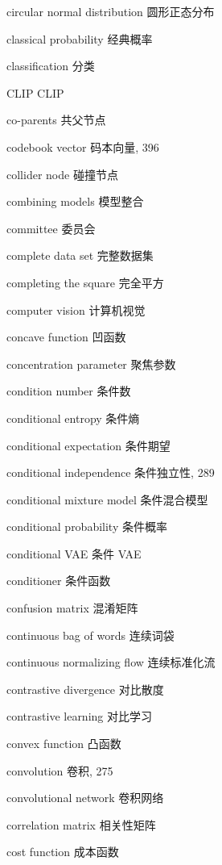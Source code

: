 circular normal distribution 圆形正态分布\par
classical probability 经典概率\par
classification 分类\par
CLIP CLIP\par
co-parents 共父节点\par
codebook vector 码本向量, 396\par
collider node 碰撞节点\par
combining models 模型整合\par
committee 委员会\par
complete data set 完整数据集\par
completing the square 完全平方\par
computer vision 计算机视觉\par
concave function 凹函数\par
concentration parameter 聚焦参数\par
condition number 条件数\par
conditional entropy 条件熵\par
conditional expectation 条件期望\par
conditional independence 条件独立性, 289\par
conditional mixture model 条件混合模型\par
conditional probability 条件概率\par
conditional VAE 条件 VAE\par
conditioner 条件函数\par
confusion matrix 混淆矩阵\par
continuous bag of words 连续词袋\par
continuous normalizing flow 连续标准化流\par
contrastive divergence 对比散度\par
contrastive learning 对比学习\par
convex function 凸函数\par
convolution 卷积, 275\par
convolutional network 卷积网络\par
correlation matrix 相关性矩阵\par
cost function 成本函数\par

